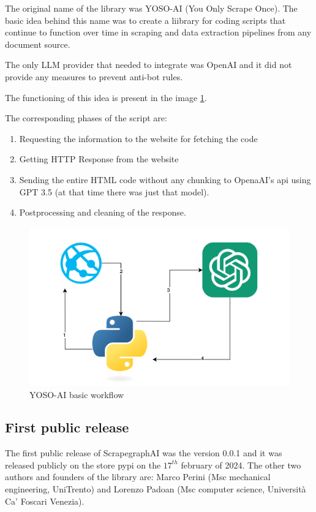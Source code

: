 The original name of the library was YOSO-AI (You Only Scrape Once). The basic idea behind this name was to create a liibrary for coding scripts that continue to function over time in scraping and data extraction pipelines from any document source.

The only LLM provider that needed to integrate was OpenAI and it did not provide any measures to prevent anti-bot rules.

The functioning of this idea is present in the image 
\ref{fig:yoso}.

The corresponding phases of the script are:
\begin{enumerate}
    \item Requesting the information to the website for fetching the code
    \item Getting HTTP Response from the website
    \item Sending the entire HTML code without any chunking to OpenaAI's api using GPT 3.5 (at that time there was just that model). 
    \item Postprocessing and cleaning of the response. 
\end{enumerate}

\begin{figure}[h!]
    \centering
    \includegraphics[scale=0.7]{Assets/YOSO.png}
    \caption{YOSO-AI basic workflow}
    \label{fig:yoso}
\end{figure}

\subsection{First public release}
The first public release of ScrapegraphAI  was the version 0.0.1 and it was released publicly on the store pypi on the $17^{th}$ february of 2024. The other two authors and founders of the library are: Marco Perini (Msc mechanical engineering, UniTrento) and Lorenzo Padoan (Msc computer science, Università Ca'​ Foscari Venezia).

